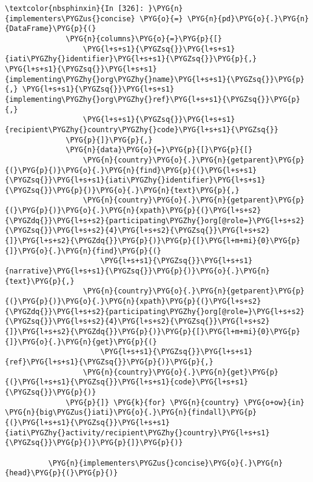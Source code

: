 \documentclass[letterpaper,10pt,english]{sphinxmanual}
\begin{document}
\begin{Verbatim}[commandchars=\\\{\}]
\textcolor{nbsphinxin}{In [326]: }\PYG{n}{implementers\PYGZus{}concise} \PYG{o}{=} \PYG{n}{pd}\PYG{o}{.}\PYG{n}{DataFrame}\PYG{p}{(}
              \PYG{n}{columns}\PYG{o}{=}\PYG{p}{[}
                  \PYG{l+s+s1}{\PYGZsq{}}\PYG{l+s+s1}{iati\PYGZhy{}identifier}\PYG{l+s+s1}{\PYGZsq{}}\PYG{p}{,} \PYG{l+s+s1}{\PYGZsq{}}\PYG{l+s+s1}{implementing\PYGZhy{}org\PYGZhy{}name}\PYG{l+s+s1}{\PYGZsq{}}\PYG{p}{,} \PYG{l+s+s1}{\PYGZsq{}}\PYG{l+s+s1}{implementing\PYGZhy{}org\PYGZhy{}ref}\PYG{l+s+s1}{\PYGZsq{}}\PYG{p}{,}
                  \PYG{l+s+s1}{\PYGZsq{}}\PYG{l+s+s1}{recipient\PYGZhy{}country\PYGZhy{}code}\PYG{l+s+s1}{\PYGZsq{}}
              \PYG{p}{]}\PYG{p}{,}
              \PYG{n}{data}\PYG{o}{=}\PYG{p}{[}\PYG{p}{[}
                  \PYG{n}{country}\PYG{o}{.}\PYG{n}{getparent}\PYG{p}{(}\PYG{p}{)}\PYG{o}{.}\PYG{n}{find}\PYG{p}{(}\PYG{l+s+s1}{\PYGZsq{}}\PYG{l+s+s1}{iati\PYGZhy{}identifier}\PYG{l+s+s1}{\PYGZsq{}}\PYG{p}{)}\PYG{o}{.}\PYG{n}{text}\PYG{p}{,}
                  \PYG{n}{country}\PYG{o}{.}\PYG{n}{getparent}\PYG{p}{(}\PYG{p}{)}\PYG{o}{.}\PYG{n}{xpath}\PYG{p}{(}\PYG{l+s+s2}{\PYGZdq{}}\PYG{l+s+s2}{participating\PYGZhy{}org[@role=}\PYG{l+s+s2}{\PYGZsq{}}\PYG{l+s+s2}{4}\PYG{l+s+s2}{\PYGZsq{}}\PYG{l+s+s2}{]}\PYG{l+s+s2}{\PYGZdq{}}\PYG{p}{)}\PYG{p}{[}\PYG{l+m+mi}{0}\PYG{p}{]}\PYG{o}{.}\PYG{n}{find}\PYG{p}{(}
                      \PYG{l+s+s1}{\PYGZsq{}}\PYG{l+s+s1}{narrative}\PYG{l+s+s1}{\PYGZsq{}}\PYG{p}{)}\PYG{o}{.}\PYG{n}{text}\PYG{p}{,}
                  \PYG{n}{country}\PYG{o}{.}\PYG{n}{getparent}\PYG{p}{(}\PYG{p}{)}\PYG{o}{.}\PYG{n}{xpath}\PYG{p}{(}\PYG{l+s+s2}{\PYGZdq{}}\PYG{l+s+s2}{participating\PYGZhy{}org[@role=}\PYG{l+s+s2}{\PYGZsq{}}\PYG{l+s+s2}{4}\PYG{l+s+s2}{\PYGZsq{}}\PYG{l+s+s2}{]}\PYG{l+s+s2}{\PYGZdq{}}\PYG{p}{)}\PYG{p}{[}\PYG{l+m+mi}{0}\PYG{p}{]}\PYG{o}{.}\PYG{n}{get}\PYG{p}{(}
                      \PYG{l+s+s1}{\PYGZsq{}}\PYG{l+s+s1}{ref}\PYG{l+s+s1}{\PYGZsq{}}\PYG{p}{)}\PYG{p}{,}
                  \PYG{n}{country}\PYG{o}{.}\PYG{n}{get}\PYG{p}{(}\PYG{l+s+s1}{\PYGZsq{}}\PYG{l+s+s1}{code}\PYG{l+s+s1}{\PYGZsq{}}\PYG{p}{)}
              \PYG{p}{]} \PYG{k}{for} \PYG{n}{country} \PYG{o+ow}{in} \PYG{n}{big\PYGZus{}iati}\PYG{o}{.}\PYG{n}{findall}\PYG{p}{(}\PYG{l+s+s1}{\PYGZsq{}}\PYG{l+s+s1}{iati\PYGZhy{}activity/recipient\PYGZhy{}country}\PYG{l+s+s1}{\PYGZsq{}}\PYG{p}{)}\PYG{p}{]}\PYG{p}{)}
          
          \PYG{n}{implementers\PYGZus{}concise}\PYG{o}{.}\PYG{n}{head}\PYG{p}{(}\PYG{p}{)}
\end{Verbatim}
\end{document}
